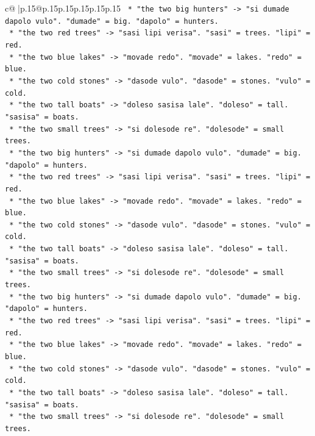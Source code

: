 \documentclass{article}
\begin{document}
{\begin{supertabular}{c@{$\;$}|p{.15\linewidth}@{}p{.15\linewidth}p{.15\linewidth}p{.15\linewidth}p{.15\linewidth}p{.15\linewidth}}
{{{\texttt{            *   "the two big hunters" {-}> "si dumade dapolo vulo". "dumade" = big. "dapolo" = hunters.} \\
\texttt{            *   "the two red trees" {-}> "sasi lipi verisa". "sasi" = trees. "lipi" = red.} \\
\texttt{            *   "the two blue lakes" {-}> "movade redo". "movade" = lakes. "redo" = blue.} \\
\texttt{            *   "the two cold stones" {-}> "dasode vulo". "dasode" = stones. "vulo" = cold.} \\
\texttt{            *   "the two tall boats" {-}> "doleso sasisa lale". "doleso" = tall. "sasisa" = boats.} \\
\texttt{            *   "the two small trees" {-}> "si dolesode re". "dolesode" = small trees.} \\
\texttt{            *   "the two big hunters" {-}> "si dumade dapolo vulo". "dumade" = big. "dapolo" = hunters.} \\
\texttt{            *   "the two red trees" {-}> "sasi lipi verisa". "sasi" = trees. "lipi" = red.} \\
\texttt{            *   "the two blue lakes" {-}> "movade redo". "movade" = lakes. "redo" = blue.} \\
\texttt{            *   "the two cold stones" {-}> "dasode vulo". "dasode" = stones. "vulo" = cold.} \\
\texttt{            *   "the two tall boats" {-}> "doleso sasisa lale". "doleso" = tall. "sasisa" = boats.} \\
\texttt{            *   "the two small trees" {-}> "si dolesode re". "dolesode" = small trees.} \\
\texttt{            *   "the two big hunters" {-}> "si dumade dapolo vulo". "dumade" = big. "dapolo" = hunters.} \\
\texttt{            *   "the two red trees" {-}> "sasi lipi verisa". "sasi" = trees. "lipi" = red.} \\
\texttt{            *   "the two blue lakes" {-}> "movade redo". "movade" = lakes. "redo" = blue.} \\
\texttt{            *   "the two cold stones" {-}> "dasode vulo". "dasode" = stones. "vulo" = cold.} \\
\texttt{            *   "the two tall boats" {-}> "doleso sasisa lale". "doleso" = tall. "sasisa" = boats.} \\
\texttt{            *   "the two small trees" {-}> "si dolesode re". "dolesode" = small trees.} \\
}}}
\end{supertabular}}
\end{document}
